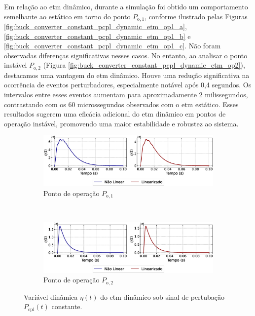 Em relação ao \acrshort{etm} dinâmico, durante a simulação foi obtido um comportamento semelhante ao estático em torno do ponto $P_{\mathrm{o}, 1}$, conforme ilustrado pelas Figuras \ref{fig:buck_converter_constant_pcpl_dynamic_etm_op1_a}, \ref{fig:buck_converter_constant_pcpl_dynamic_etm_op1_b} e \ref{fig:buck_converter_constant_pcpl_dynamic_etm_op1_c}. Não foram observadas diferenças significativas nesses casos. No entanto, ao analisar o ponto instável $P_{\mathrm{o}, 2}$ (Figura \ref{fig:buck_converter_constant_pcpl_dynamic_etm_op2}), destacamos uma vantagem do \acrshort{etm} dinâmico. Houve uma redução significativa na ocorrência de eventos perturbadores, especialmente notável após 0,4 segundos. Os intervalos entre esses eventos aumentam para aproximadamente 2 milissegundos, contrastando com os 60 microssegundos observados com o \acrshort{etm} estático. Esses resultados sugerem uma eficácia adicional do \acrshort{etm} dinâmico em pontos de operação instável, promovendo uma maior estabilidade e robustez ao sistema.

\begin{figure}[H]
  \centering
  \captionsetup{justification=centering}
  \begin{subfigure}{1.\textwidth}
    \centering
    \includegraphics[width=1.\textwidth]{figuras/dynamic-etm/buck/sim1/op1/eta.eps}
    \caption{Ponto de operação $P_{\mathrm{o}, 1}$}
  \end{subfigure}
  \\[6pt]
  \begin{subfigure}{1.\textwidth}
    \centering
    \includegraphics[width=1.\textwidth]{figuras/dynamic-etm/buck/sim1/op2/eta.eps}
    \caption{Ponto de operação $P_{\mathrm{o}, 2}$}
    \label{fig:buck_converter_dynamic_pcpl_dynamic_etm_op2_d}
  \end{subfigure}
  \caption{Variável dinâmica $\eta(t)$ do \acrshort{etm} dinâmico sob sinal de pertubação $P_{\mathrm{cpl}}(t)$ constante.}
  \label{fig:buck_converter_constant_pcpl_dynamic_etm_eta}
\end{figure}

